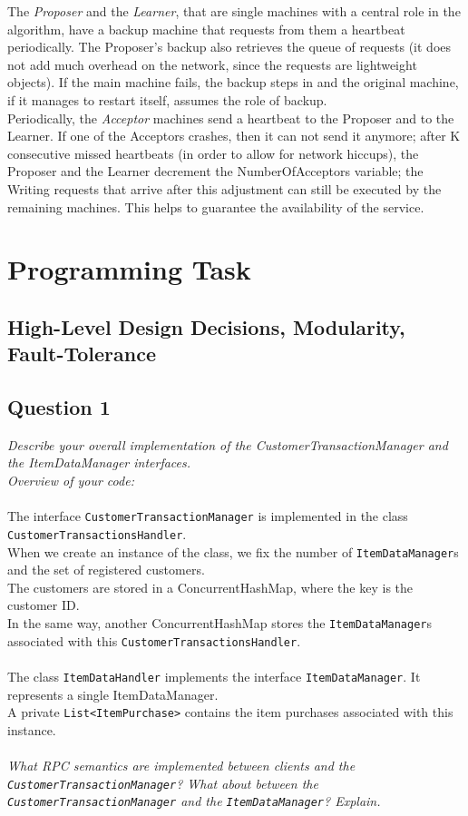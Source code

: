 \documentclass[paper=a4, fontsize=11pt]{scrartcl} %
\numberwithin{equation}{section} %
\numberwithin{figure}{section} %
\numberwithin{table}{section} %
\begin{document}
The \textit{Proposer} and the \textit{Learner}, that are single machines with a central role in the algorithm, have a backup machine that requests from them a heartbeat periodically. The Proposer's backup also retrieves the queue of requests (it does not add much overhead on the network, since the requests are lightweight objects). If the main machine fails, the backup steps in and the original machine, if it manages to restart itself, assumes the role of backup.\\
Periodically, the \textit{Acceptor} machines send a heartbeat to the Proposer and to the Learner. If one of the Acceptors crashes, then it can not send it anymore; after K consecutive missed heartbeats (in order to allow for network hiccups), the Proposer and the Learner decrement the NumberOfAcceptors variable; the Writing requests that arrive after this adjustment can still be executed by the remaining machines. This helps to guarantee the availability of the service.\\

\clearpage
\section{Programming Task}

\subsection{High-Level Design Decisions, Modularity, Fault-Tolerance}

\subsection{Question 1} 

\textit{Describe your overall implementation of the CustomerTransactionManager and the ItemDataManager interfaces. \\
Overview of your code:\\}
~\\
The interface \verb|CustomerTransactionManager| is implemented in the class \verb|CustomerTransactionsHandler|.\\
When we create an instance of the class, we fix the number of \verb|ItemDataManager|s and the set of registered customers.\\
The customers are stored in a ConcurrentHashMap, where the key is the customer ID. \\
In the same way, another ConcurrentHashMap stores the \verb|ItemDataManager|s associated with this \verb|CustomerTransactionsHandler|.\\
~\\
The class \verb|ItemDataHandler| implements the interface \verb|ItemDataManager|. It represents a single ItemDataManager.\\
A private \verb|List<ItemPurchase>| contains the item purchases associated with this instance.\\
~\\
\textit{What RPC semantics are implemented between clients and the \verb|CustomerTransactionManager|? What about between the
\verb|CustomerTransactionManager| and the \verb|ItemDataManager|? Explain.
}
\end{document}

